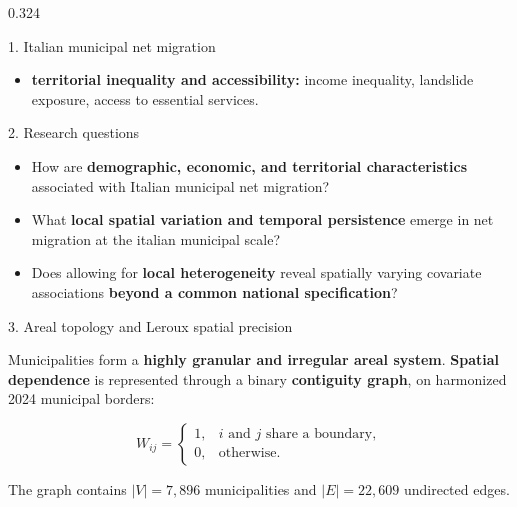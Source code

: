\documentclass[final]{beamer}
\newcommand{\smallgap}{\vspace{0.25cm}}
\begin{document}
\begin{frame}[t]
\begin{columns}[t,totalwidth=\textwidth]
\begin{column}{0.324\textwidth}
\begin{block}{1. Italian municipal net migration}
\begin{itemize}
    \item \textbf{territorial inequality and accessibility:}
    income inequality, landslide exposure, access to essential services.
\end{itemize}
\end{block}

\smallgap

\begin{block}{2. Research questions}

\justifying
\begin{itemize}

\item How are \textbf{demographic, economic, and territorial characteristics} associated with Italian municipal net migration?

\item What \textbf{local spatial variation and temporal persistence} emerge in net migration at the italian municipal scale?

\item Does allowing for \textbf{local heterogeneity} reveal spatially varying covariate associations \textbf{beyond a common national specification}?

\end{itemize}

\end{block}
\smallgap

\begin{block}{3. Areal topology and Leroux spatial precision}

\justifying
Municipalities form a \textbf{highly granular and irregular areal system}. %
\textbf{Spatial dependence} is represented through a binary \textbf{contiguity graph}, on harmonized 2024 municipal borders:

\[
W_{ij}=
\begin{cases}
1, & i \text{ and } j \text{ share a boundary},\\
0, & \text{otherwise}.
\end{cases}
\]

The graph contains $|V|=7{,}896$ municipalities and
$|E|=22{,}609$ undirected edges. \\




\end{block}
\end{column}
\end{columns}
\end{frame}
\end{document}
